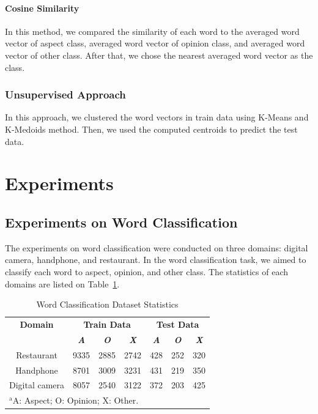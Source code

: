 \documentclass[a4paper,conference]{IEEEtran}
\begin{document}
\paragraph{Cosine Similarity}
In this method, we compared the similarity of each word to the averaged word vector of aspect class, averaged word vector of opinion class, and averaged word vector of other class. After that, we chose the nearest averaged word vector as the class.

\subsubsection{Unsupervised Approach}
In this approach, we clustered the word vectors in train data using K-Means and K-Medoids method. Then, we used the computed centroids to predict the test data.

\section{Experiments}

\subsection{Experiments on Word Classification}
The experiments on word classification were conducted on three domains: digital camera, handphone, and restaurant. In the word classification task, we aimed to classify each word to aspect, opinion, and other class. The statistics of each domains are listed on Table~\ref{tab4}.

\begin{table}[htbp]
\caption{Word Classification Dataset Statistics}
\begin{center}
\begin{tabular}{|c|c|c|c|c|c|c|}
\hline
\textbf{Domain}&\multicolumn{3}{|c|}{\textbf{Train Data}}&\multicolumn{3}{|c|}{\textbf{Test Data}}\\
\cline{2-7}
 & \textbf{\textit{A}}& \textbf{\textit{O}}&\textbf{\textit{X}}& \textbf{\textit{A}}&\textbf{\textit{O}}& \textbf{\textit{X}}\\
\hline
Restaurant&9335&2885&2742&428&252&320 \\
\hline
Handphone&8701&3009&3231&431&219&350 \\
\hline
Digital camera&8057&2540&3122&372&203&425 \\
\hline
\multicolumn{7}{l}{$^{\mathrm{a}}$A: Aspect; O: Opinion; X: Other.}\\
\end{tabular}
\label{tab4}
\end{center}
\end{table}
\end{document}
